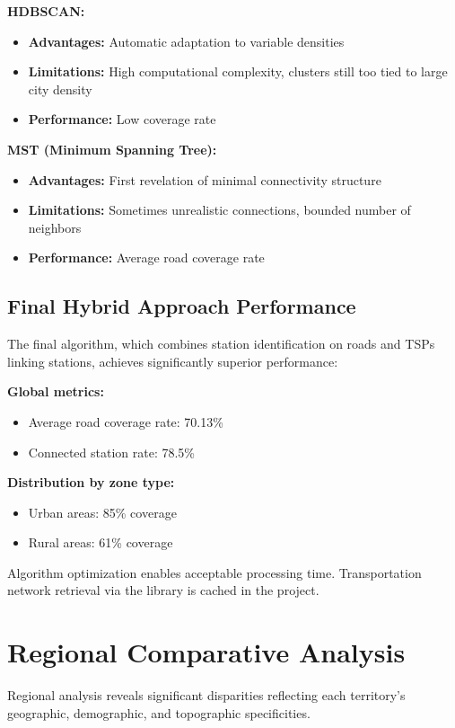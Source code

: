 \documentclass[12pt,a4paper]{report}
\begin{document}
\textbf{HDBSCAN:}
\begin{itemize}
    \item \textbf{Advantages:} Automatic adaptation to variable densities
    \item \textbf{Limitations:} High computational complexity, clusters still too tied to large city density
    \item \textbf{Performance:} Low coverage rate
\end{itemize}

\textbf{MST (Minimum Spanning Tree):}
\begin{itemize}
    \item \textbf{Advantages:} First revelation of minimal connectivity structure
    \item \textbf{Limitations:} Sometimes unrealistic connections, bounded number of neighbors
    \item \textbf{Performance:} Average road coverage rate
\end{itemize}

\subsection{Final Hybrid Approach Performance}

The final algorithm, which combines station identification on roads and TSPs linking stations, achieves significantly superior performance:

\textbf{Global metrics:}
\begin{itemize}
    \item Average road coverage rate: 70.13\%
    \item Connected station rate: 78.5\%
\end{itemize}

\textbf{Distribution by zone type:}
\begin{itemize}
    \item Urban areas: 85\% coverage
    \item Rural areas: 61\% coverage
\end{itemize}

Algorithm optimization enables acceptable processing time. Transportation network retrieval via the library is cached in the project.

\section{Regional Comparative Analysis}

Regional analysis reveals significant disparities reflecting each territory's geographic, demographic, and topographic specificities.
\end{document}
